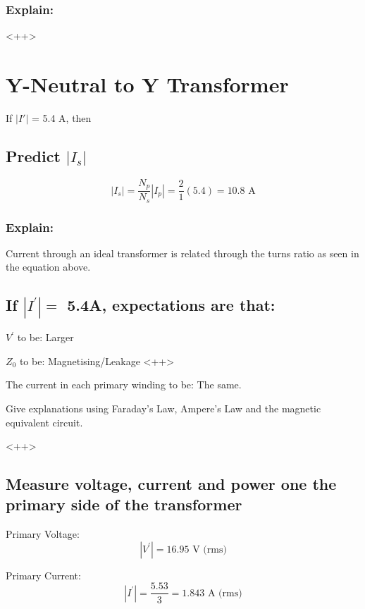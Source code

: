 \documentclass{article}
\begin{document}
\subsubsection{Explain:} 
<++>

\section{Y-Neutral to Y Transformer} 

If $|I'|$ = 5.4 A, then

\subsection{Predict $|I_s|$}

\begin{equation}
  |I_s | = \frac{N_p}{N_s} | I_p | = \frac{2}{1} (5.4) = 10.8 \text{ A}
\end{equation}

\subsubsection{Explain:} 
Current through an ideal transformer is related through the turns ratio as seen in the equation above.

\subsection{If $|I^{'} | = $ 5.4A, expectations are that:}

$V^{'}$ to be: Larger

$Z_0$ to be: Magnetising/Leakage <++>

The current in each primary winding to be: The same.

Give explanations using Faraday's Law, Ampere's Law and the magnetic equivalent circuit.

<++>

\subsection{Measure voltage, current and power one the primary side of the transformer} 

Primary Voltage:
\begin{equation}
  | V^{'} | = 16.95 \text{ V (rms)}
\end{equation}

Primary Current:
\begin{equation}
  | I^{'} | = \frac{5.53}{3} = 1.843 \text{ A (rms)}
\end{equation}
\end{document}
